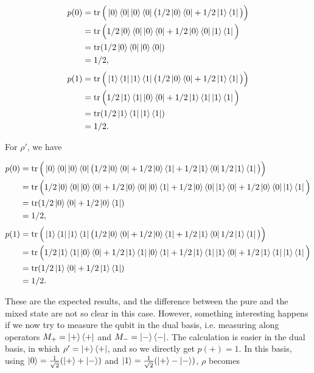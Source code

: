 \begin{align}
    p(0) &= \operatorname{tr}\Big(\ket{0}\bra{0}\ket{0}\bra{0}\big(1/2 \ket{0}\bra{0} + 1/2 \ket{1}\bra{1}\big)\Big)\\
         &= \operatorname{tr}\Big(1/2 \ket{0}\bra{0}\ket{0}\bra{0} + 1/2 \ket{0}\bra{0}\ket{1}\bra{1}\Big)\\
         &= \operatorname{tr}(1/2 \ket{0}\bra{0}\ket{0}\bra{0})\\
         &= 1/2,
\end{align}
\begin{align}
    p(1) &= \operatorname{tr}\Big(\ket{1}\bra{1}\ket{1}\bra{1}\big(1/2 \ket{0}\bra{0} + 1/2 \ket{1}\bra{1}\big)\Big)\\
         &= \operatorname{tr}\Big(1/2 \ket{1}\bra{1}\ket{0}\bra{0} + 1/2 \ket{1}\bra{1}\ket{1}\bra{1}\Big)\\
         &= \operatorname{tr}(1/2 \ket{1}\bra{1}\ket{1}\bra{1})\\
         &= 1/2.
\end{align}

\noindent For $\rho'$, we have

\begin{align}
    p(0) &= \operatorname{tr}\Big(\ket{0}\bra{0}\ket{0}\bra{0}\big(1/2 \ket{0}\bra{0} + 1/2 \ket{0}\bra{1} + 1/2 \ket{1}\bra{0} 1/2 \ket{1}\bra{1}\big)\Big)\\
         &= \operatorname{tr}\Big(1/2 \ket{0}\bra{0}\ket{0}\bra{0} +1/2 \ket{0}\bra{0}\ket{0}\bra{1} + 1/2 \ket{0}\bra{0}\ket{1}\bra{0} + 1/2 \ket{0}\bra{0}\ket{1}\bra{1}\Big)\\
         &= \operatorname{tr}(1/2 \ket{0}\bra{0} + 1/2 \ket{0}\bra{1})\\
         &= 1/2,
\end{align}
\begin{align}
    p(1) &= \operatorname{tr}\Big(\ket{1}\bra{1}\ket{1}\bra{1}\big(1/2 \ket{0}\bra{0} + 1/2 \ket{0}\bra{1} + 1/2 \ket{1}\bra{0} 1/2 \ket{1}\bra{1}\big)\Big)\\
         &= \operatorname{tr}\Big(1/2 \ket{1}\bra{1}\ket{0}\bra{0} +1/2 \ket{1}\bra{1}\ket{0}\bra{1} + 1/2 \ket{1}\bra{1}\ket{1}\bra{0} + 1/2 \ket{1}\bra{1}\ket{1}\bra{1}\Big)\\
         &= \operatorname{tr}(1/2 \ket{1}\bra{0} + 1/2 \ket{1}\bra{1})\\
         &= 1/2.
\end{align}

These are the expected results, and the difference between the pure and the mixed state are not so clear in this case. However, something interesting happens if we now try to measure the qubit in the dual basis, i.e. measuring along operators $M_+ = \ket{+}\bra{+}$ and $M_- = \ket{-}\bra{-}$. The calculation is easier in the dual basis, in which $\rho' = \ket{+}\bra{+}$, and so we directly get $p(+) = 1$. In this basis, using $\ket{0} = \frac{1}{\sqrt{2}}(\ket{+} + \ket{-})$ and $\ket{1} = \frac{1}{\sqrt{2}}(\ket{+} - \ket{-})$, $\rho$ becomes

